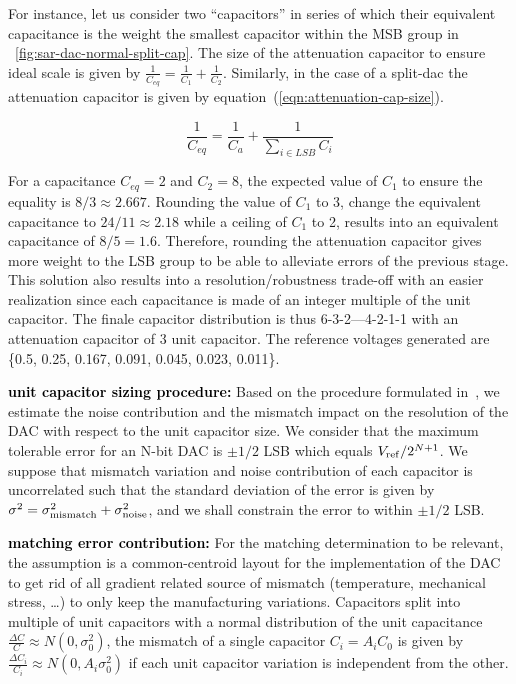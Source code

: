 For instance, let us consider two ``capacitors'' in series of which their equivalent capacitance is the weight the smallest capacitor within the MSB group in \figurename~\ref{fig:sar-dac-normal-split-cap}. The size of the attenuation capacitor to ensure ideal scale is given by \(\frac{1}{C_{eq}} = \frac{1}{C_1}+\frac{1}{C_2}\). Similarly, in the case of a split-dac the attenuation capacitor is given by equation~(\ref{eqn:attenuation-cap-size}).

\begin{equation}
\label{eqn:attenuation-cap-size}
\frac{1}{C_{eq}} = \frac{1}{C_a}+\frac{1}{\sum_{i \in LSB}{C_i}}
\end{equation}

For a capacitance \(C_{eq} = 2 \) and \(C_2 = 8\), the expected value of \(C_1\) to ensure the equality is \(8/3 \approx 2.667 \). Rounding the value of \(C_1\) to 3, change the equivalent capacitance to \(24/11 \approx 2.18 \) while a ceiling of \(C_1\) to 2, results into an equivalent capacitance of \(8/5 = 1.6 \). Therefore, rounding the attenuation capacitor gives more weight to the LSB group to be able to alleviate errors of the previous stage. This solution also results into a resolution/robustness trade-off with an easier realization since each capacitance is made of an integer multiple of the unit capacitor. The finale capacitor distribution is thus 6-3-2---4-2-1-1 with an attenuation capacitor of 3 unit capacitor. The reference voltages generated are \{0.5, 0.25, 0.167, 0.091, 0.045, 0.023, 0.011\}.

\textbf{\textcolor{black}{unit capacitor sizing procedure:}}
Based on the procedure formulated in~\cite{Yue2013}, we estimate the noise contribution and the mismatch impact on the resolution of the DAC with respect to the unit capacitor size. We consider that the maximum tolerable error for an N-bit DAC is $\pm 1/2$ LSB which equals $V_{\rm ref}/2^{N+1}$. We suppose that mismatch variation and noise contribution of each capacitor is uncorrelated such that the standard deviation of the error is given by $\sigma^2 = \sigma_{\rm mismatch}^2 + \sigma_{\rm noise}^2$, and we shall constrain the error to within $\pm 1/2$ LSB.

\textbf{\textcolor{black}{matching error contribution:}}
For the matching determination to be relevant, the assumption is a common-centroid layout for the implementation of the DAC to get rid of all gradient related source of mismatch (temperature, mechanical stress, \ldots) to only keep the manufacturing variations. Capacitors split into multiple of unit capacitors with a normal distribution of the unit capacitance $\frac{\Delta C}{C} \approx N(0, \sigma_0^2)$, the mismatch of a single capacitor \(C_i = A_iC_0\) is given by $\frac{\Delta C_i}{C_i} \approx N(0, A_i\sigma_0^2)$ if each unit capacitor variation is independent from the other.

